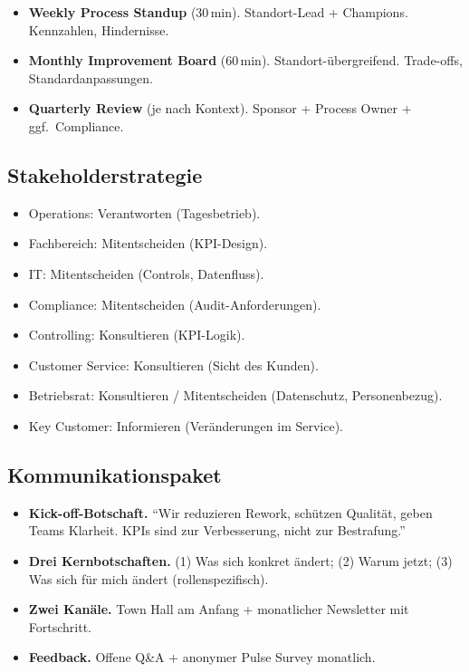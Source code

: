 \documentclass[11pt,a4paper,oneside]{article}
\begin{document}
\begin{itemize}
  \item \textbf{Weekly Process Standup} (30\,min). Standort-Lead + Champions. Kennzahlen, Hindernisse.
  \item \textbf{Monthly Improvement Board} (60\,min). Standort-übergreifend. Trade-offs, Standardanpassungen.
  \item \textbf{Quarterly Review} (je nach Kontext). Sponsor + Process Owner + ggf.\ Compliance.
\end{itemize}

\subsection{Stakeholderstrategie}

\begin{itemize}
  \item Operations: Verantworten (Tagesbetrieb).
  \item Fachbereich: Mitentscheiden (KPI-Design).
  \item IT: Mitentscheiden (Controls, Datenfluss).
  \item Compliance: Mitentscheiden (Audit-Anforderungen).
  \item Controlling: Konsultieren (KPI-Logik).
  \item Customer Service: Konsultieren (Sicht des Kunden).
  \item Betriebsrat: Konsultieren / Mitentscheiden (Datenschutz, Personenbezug).
  \item Key Customer: Informieren (Veränderungen im Service).
\end{itemize}

\subsection{Kommunikationspaket}

\begin{itemize}
  \item \textbf{Kick-off-Botschaft.} ``Wir reduzieren Rework, schützen Qualität, geben Teams Klarheit. KPIs sind zur Verbesserung, nicht zur Bestrafung.''
  \item \textbf{Drei Kernbotschaften.} (1) Was sich konkret ändert; (2) Warum jetzt; (3) Was sich für mich ändert (rollenspezifisch).
  \item \textbf{Zwei Kanäle.} Town Hall am Anfang + monatlicher Newsletter mit Fortschritt.
  \item \textbf{Feedback.} Offene Q\&A + anonymer Pulse Survey monatlich.
\end{itemize}
\end{document}
